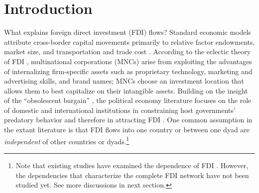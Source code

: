 \documentclass[reqno,onecolumn,letterpaper,12pt]{article}
\begin{document}

\sloppy
\clearpage
\doublespacing
\setcounter{page}{1}
\section{Introduction}


What explains foreign direct investment (FDI) flows? Standard economic models attribute cross-border capital movements primarily to relative factor endowments, market size, and transportation and trade cost \citep{Helpman:1984,Carr_et_al:2001}.
According to the eclectic theory of FDI \citep{Dunning:1988,Dunning:1992}, multinational corporations (MNCs) arise from exploiting the advantages of internalizing firm-specific assets such as proprietary technology, marketing and advertising skills, and brand names; MNCs choose an investment location that allows them to best capitalize on their intangible assets. Building on the insight of the ``obsolescent bargain'' \citep{Vernon:1971,Vernon:1980}, the political economy literature focuses on the role of domestic and international institutions in constraining host governments' predatory behavior and therefore in attracting FDI \citep[e.g.,][]{Jensen:2003,Li_Resnick:2003,Buthe_Milner:2008,Allee_Peinhardt:2011,Kerner:2009}. One common assumption in the extant literature is that FDI flows into one country or between one dyad are \emph{independent} of other countries or dyads.\footnote{Note that existing studies have examined the dependence of FDI \citep[e.g.,][]{coughlin2000foreign,blanco2012spatial,blonigen2007fdi,Baltagi_et_al:2007}. However, the dependencies that characterize the complete FDI network have not been studied yet. See more discussions in next section. }
\end{document}
